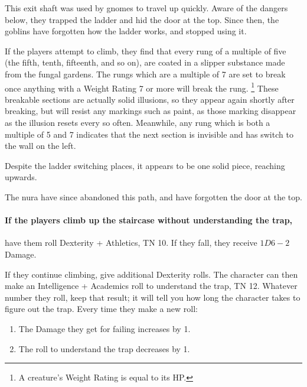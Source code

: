 \begin{multicols}{2}

\begin{exampletext}

	This exit shaft was used by gnomes to travel up quickly.
	Aware of the dangers below, they trapped the ladder and hid the door at the top.
	Since then, the goblins have forgotten how the ladder works, and stopped using it.

\end{exampletext}

If the players attempt to climb, they find that every rung of a multiple of five (the fifth, tenth, fifteenth, and so on), are coated in a slipper substance made from the fungal gardens.
The rungs which are a multiple of 7 are set to break once anything with a Weight Rating 7 or more will break the rung.%
\footnote{A creature's Weight Rating is equal to its HP.}
These breakable sections are actually solid illusions, so they appear again shortly after breaking, but will resist any markings such as paint, as those marking disappear as the illusion resets every so often.
Meanwhile, any rung which is both a multiple of 5 and 7 indicates that the next section is invisible and has switch to the wall on the left.

Despite the ladder switching places, it appears to be one solid piece, reaching upwards.

The nura have since abandoned this path, and have forgotten the door at the top.

\paragraph{If the players climb up the staircase without understanding the trap,}
have them roll Dexterity + Athletics, TN 10.
If they fall, they receive $1D6-2$ Damage.

If they continue climbing, give additional Dexterity rolls.
The character can then make an Intelligence + Academics roll to understand the trap, TN 12.
Whatever number they roll, keep that result; it will tell you how long the character takes to figure out the trap.
Every time they make a new roll:

\begin{enumerate}

	\item{The Damage they get for failing increases by 1.}
	\item{The roll to understand the trap decreases by 1.}

\end{enumerate}


\end{multicols}
